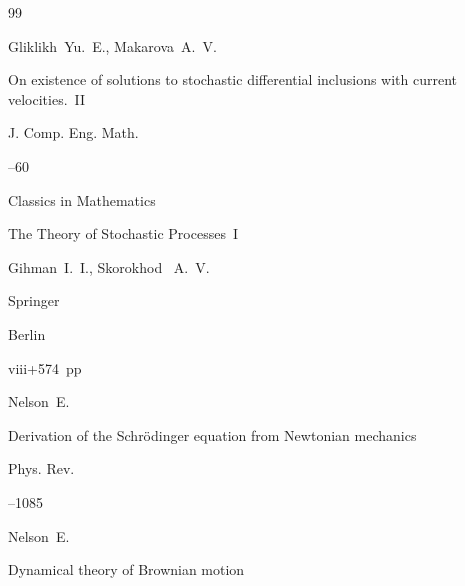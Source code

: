 \begin{thebibliography}{99}

\by Gliklikh~Yu.~E., Makarova~A.~V.

\paper On existence of solutions to stochastic differential inclusions with current velocities.~II

\jour J. Comp. Eng. Math.




--60









\serial  Classics in Mathematics



\book The Theory of Stochastic Processes~I

\by Gihman~I.~I., Skorokhod~ A.~V.


\publ Springer 

\publaddr Berlin 

\totalpages viii+574~pp \nofrills






\by Nelson~E. 

\paper Derivation of the Schr\"{o}dinger equation from Newtonian mechanics 

\jour Phys. Rev. 




--1085





\by Nelson~E. 

\book Dynamical theory of Brownian motion 


\end{thebibliography}
